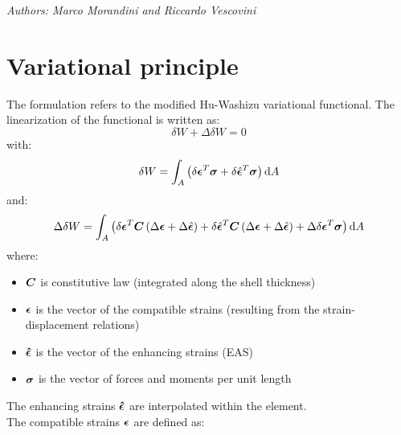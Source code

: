 \emph{Authors: Marco Morandini and Riccardo Vescovini}
\newcommand{ \fracd }[ 2 ]{ \frac{ \displaystyle{ #1 } }{ \displaystyle{ #2 }} }
\newcommand{ \fracdp }[ 2 ]{ \frac{ \displaystyle{ \partial #1 } }{ \displaystyle{ \partial #2 }} }
\newcommand{ \Rot }[ 1 ]{ \texttt{Rot} \plbr{ #1 } }
\newcommand{ \VecRot }[ 1 ]{ \texttt{VecRot} \plbr{ #1 } }
\newcommand{ \valxii }[ 0 ]{\plbr{ \T{ \xi }_{ i } } }
\newcommand{ \valxin }[ 0 ]{\plbr{ \T{ \xi }_{ n } } }
\newcommand{ \valxiA }[ 0 ]{\plbr{ \T{ \xi }_{ A } } }
\newcommand{ \valxio }[ 0 ]{\plbr{ \T{ \xi }_{ 0 } } }
\noindent


\section{Variational principle}
The formulation refers to the modified Hu-Washizu variational functional. The linearization of the functional is written as:
\begin{equation}
\delta W + \Delta \delta W = 0
\end{equation}
with:
\begin{equation}
\delta W = \int_A \left( 
\delta{\bm{\epsilon}}^T \bm{\sigma} + \delta \hat{\bm{\epsilon}}^T \bm{\sigma}
 \right) \text{d}A
\label{eq:deltaW}
\end{equation}
and:
\begin{equation}
\Delta \delta W = \int_A \left( 
\delta {\bm{\epsilon}} ^T  \bm{C} \left(  \Delta {\bm{\epsilon}}  + \Delta \hat{\bm{\epsilon}} \right) +
\delta \hat{\bm{\epsilon}} ^T  \bm{C} \left(  \Delta {\bm{\epsilon}}  + \Delta \hat{\bm{\epsilon}} \right) +
\Delta \delta { \bm{\epsilon} }^T \bm{\sigma}
 \right) \text{d}A
\label{eq:DeltadeltaW}
\end{equation}
where:
\begin{itemize}
\item $\bm{C}$ is constitutive law (integrated along the shell thickness)
\item $\bm{\epsilon}$ is the vector of the compatible strains (resulting from the strain-displacement relations)
\item $\bm{\hat{\epsilon}}$ is the vector of the enhancing strains (EAS)
\item $\bm{\sigma}$ is the vector of forces and moments per unit length
\end{itemize}
The enhancing strains $\bm{\hat{\epsilon}}$ are interpolated within the element.\\
The compatible strains $\bm{\epsilon}$ are defined as:
